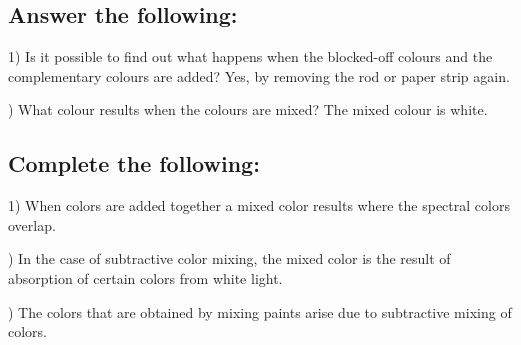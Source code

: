 \documentclass[12pt]{article}
\begin{document}
\subsection*{Answer the following:}

1) Is it possible to find out what happens when
the blocked-off colours and the complementary
colours are added?
Yes, by removing the rod or paper strip
again.

) What colour results when the colours are
mixed?
The mixed colour is white.


\subsection*{Complete the following:}

1) When colors are added together a mixed color results where the spectral colors overlap.

) In the case of subtractive color mixing, the
mixed color is the result of absorption of
certain colors from white light.

) The colors that are obtained by mixing paints
arise due to subtractive mixing of colors. 
\end{document}
